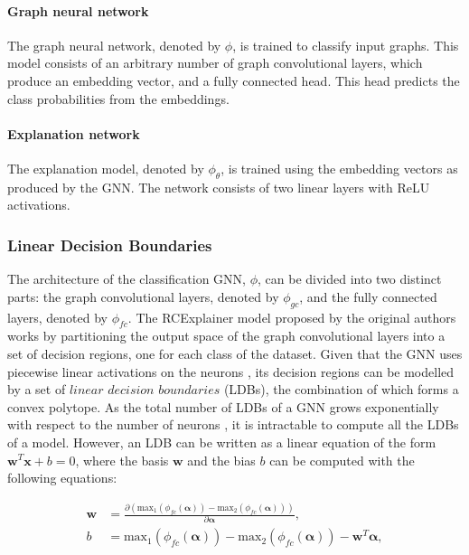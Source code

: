 \paragraph{Graph neural network}
The graph neural network, denoted by $\phi$, is trained to classify input graphs. This model consists of an arbitrary number of graph convolutional layers, which produce an embedding vector, and a fully connected head. This head predicts the class probabilities from the embeddings.

\paragraph{Explanation network}
The explanation model, denoted by $\phi_\theta$, is trained using the embedding vectors as produced by the GNN. The network consists of two linear layers with ReLU activations.


\subsubsection{Linear Decision Boundaries}
The architecture of the classification GNN, $\phi$, can be divided into two distinct parts: the graph convolutional layers, denoted by $\phi_{gc}$, and the fully connected layers, denoted by $\phi_{fc}$.
The RCExplainer model proposed by the original authors works by partitioning the output space of the graph convolutional layers into a set of decision regions, one for each class of the dataset. Given that the GNN uses piecewise linear activations on the neurons \cite{adebayo2018}, its decision regions can be modelled by a set of $\textit{linear decision boundaries}$ (LDBs), the combination of which forms a convex polytope. As the total number of LDBs of a GNN grows exponentially with respect to the number of neurons \cite{montufar2014number}, it is intractable to compute all the LDBs of a model.
However, an LDB can be written as a linear equation of the form $\textbf{w}^{T}\textbf{x} + b = 0$, where the basis $\textbf{w}$ and the bias $b$ can be computed with the following equations:

\begin{align}
    \textbf{w} &= \frac{\partial \left(\text{max}_{1}(\phi_{fc}(\boldsymbol{\alpha})) - \text{max}_{2}(\phi_{fc}(\boldsymbol{\alpha}))\right)}{\partial \boldsymbol{\alpha}}, \\
    b &= \text{max}_{1}(\phi_{fc}(\boldsymbol{\alpha})) - \text{max}_{2}(\phi_{fc}(\boldsymbol{\alpha})) - \textbf{w}^{T}\boldsymbol{\alpha},
\end{align}

